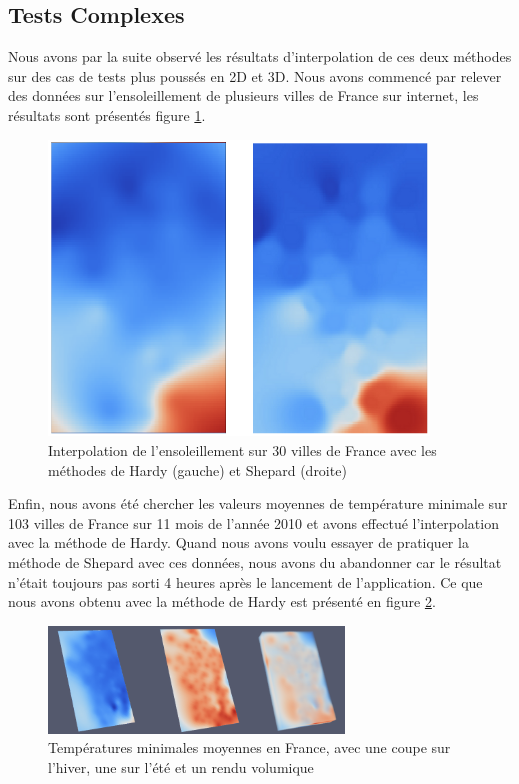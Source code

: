 \documentclass[a4paper,9pt]{article}
\begin{document}
\subsection{Tests Complexes}
\label{subsec:tests_complexes}
Nous avons par la suite observé les résultats d'interpolation de ces deux méthodes sur des cas de tests plus poussés en 2D et 3D. Nous avons commencé par relever des données sur l'ensoleillement de plusieurs villes de France sur internet, les résultats sont présentés figure \ref{enso}.
\begin{figure}[!h]
\centering
\includegraphics[width=0.9\textwidth]{images/enso.png}
\caption{Interpolation de l'ensoleillement sur 30 villes de France avec les méthodes de Hardy (gauche) et Shepard (droite)}
\label{enso}
\end{figure}

Enfin, nous avons été chercher les valeurs moyennes de température minimale sur 103 villes de France sur 11 mois de l'année 2010 et avons effectué l'interpolation avec la méthode de Hardy. Quand nous avons voulu essayer de pratiquer la méthode de Shepard avec ces données, nous avons du abandonner car le résultat n'était toujours pas sorti 4 heures après le lancement de l'application. Ce que nous avons obtenu avec la méthode de Hardy est présenté en figure \ref{tmin}.
\begin{figure}[!h]
\centering
\includegraphics[width=0.7\textwidth]{images/multiquadric/Tmin_mq.png}
\caption{Températures minimales moyennes en France, avec une coupe sur l'hiver, une sur l'été et un rendu volumique}
\label{tmin}
\end{figure}
\end{document}
